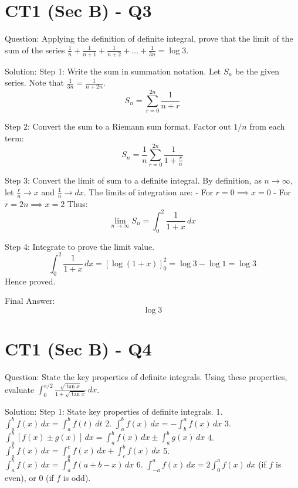 \documentclass{article}
\begin{document}
\section*{CT1 (Sec B) - Q3}
Question:
Applying the definition of definite integral, prove that the limit of the sum of the series \(\frac{1}{n} + \frac{1}{n+1} + \frac{1}{n+2} + \dots + \frac{1}{3n} = \log 3\).

Solution:
Step 1: Write the sum in summation notation.
Let \(S_n\) be the given series. Note that \(\frac{1}{3n} = \frac{1}{n+2n}\).
\[
S_n = \sum_{r=0}^{2n} \frac{1}{n+r}
\]

Step 2: Convert the sum to a Riemann sum format.
Factor out \(1/n\) from each term:
\[
S_n = \frac{1}{n} \sum_{r=0}^{2n} \frac{1}{1 + \frac{r}{n}}
\]

Step 3: Convert the limit of sum to a definite integral.
By definition, as \(n \to \infty\), let \(\frac{r}{n} \to x\) and \(\frac{1}{n} \to dx\).
The limits of integration are:
- For \(r = 0 \implies x = 0\)
- For \(r = 2n \implies x = 2\)
Thus:
\[
\lim_{n \to \infty} S_n = \int_0^2 \frac{1}{1+x} \, dx
\]

Step 4: Integrate to prove the limit value.
\[
\int_0^2 \frac{1}{1+x} \, dx = \left[ \log(1+x) \right]_0^2 = \log 3 - \log 1 = \log 3
\]
Hence proved.

Final Answer:
\[
\boxed{\log 3}
\]

\section*{CT1 (Sec B) - Q4}
Question:
State the key properties of definite integrals. Using these properties, evaluate \(\int_0^{\pi/2} \frac{\sqrt{\tan x}}{1 + \sqrt{\tan x}} \, dx\).

Solution:
Step 1: State key properties of definite integrals.
1. \(\int_a^b f(x) \, dx = \int_a^b f(t) \, dt\)
2. \(\int_a^b f(x) \, dx = -\int_b^a f(x) \, dx\)
3. \(\int_a^b [f(x) \pm g(x)] \, dx = \int_a^b f(x) \, dx \pm \int_a^b g(x) \, dx\)
4. \(\int_a^b f(x) \, dx = \int_a^c f(x) \, dx + \int_c^b f(x) \, dx\)
5. \(\int_a^b f(x) \, dx = \int_a^b f(a+b-x) \, dx\)
6. \(\int_{-a}^a f(x) \, dx = 2\int_0^a f(x) \, dx\) (if \(f\) is even), or \(0\) (if \(f\) is odd).
\end{document}
